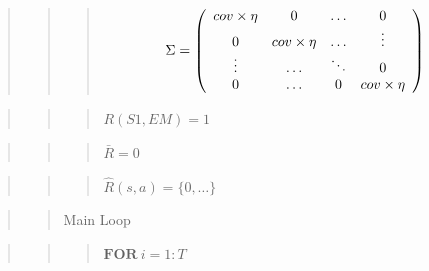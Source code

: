 \documentclass[10pt,a4paper,onecolumn]{article}
\begin{document}
\begin{quote}
\begin{quote}
\begin{quote}
\[
\Sigma = \left(
    \begin{array}{*4{c}}
    cov \times \eta &  0 &  \ldots & 0 \\
     0 &  cov \times \eta &  \ldots & \vdots \\
    \vdots &  \ldots &  \ddots & 0 \\
     0 &  \ldots &  0 & cov \times \eta \\     
  \end{array}\right)
\]
\end{quote}
\end{quote}
\end{quote}

\begin{quote}
\begin{quote}
\begin{quote}
\(R(S1, EM) = 1\)
\end{quote}
\end{quote}
\end{quote}

\begin{quote}
\begin{quote}
\begin{quote}
\(\bar{R} = 0\)
\end{quote}
\end{quote}
\end{quote}

\begin{quote}
\begin{quote}
\begin{quote}
\(\hat{R}(s,a) = \{0,\ldots\}\)
\end{quote}
\end{quote}
\end{quote}

\begin{quote}
\begin{quote}
Main Loop
\end{quote}
\end{quote}

\begin{quote}
\begin{quote}
\begin{quote}
\(\textbf{FOR}\ i = 1:T\)
\end{quote}
\end{quote}
\end{quote}
\end{document}
